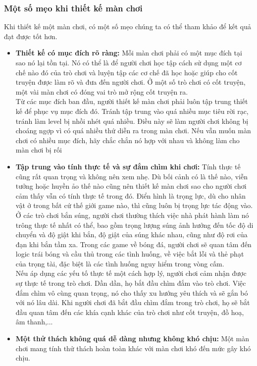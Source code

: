 \subsubsection{Một số mẹo khi thiết kế màn chơi}
\hspace*{0.5cm}  Khi thiết kế một màn chơi, có một số mẹo chúng ta có thể tham khảo để kết quả đạt được tốt hơn.
\begin{itemize}
	\item \textbf{Thiết kế có mục đích rõ ràng: } Mỗi màn chơi phải có một mục đích tại sao nó lại tồn tại. Nó có thể là để người chơi học tập cách sử dụng một cơ chế nào đó của trò chơi và luyện tập các cơ chế đã học hoặc giúp cho cốt truyện được làm rõ và đưa đến người chơi. Ở một số trò chơi có cốt truyện, một vài màn chơi có đóng vai trò mở rộng cốt truyện ra.\\
	Từ các mục đích ban đầu, người thiết kế màn chơi phải luôn tập trung thiết kế để phục vụ mục đích đó. Tránh tập trung vào quá nhiều mục tiêu rời rạc, tránh làm level bị nhồi nhét quá nhiều. Điều này sẽ làm người chơi không bị choáng ngợp vì có quá nhiều thứ diễn ra trong màn chơi. Nếu vẫn muốn màn chơi có nhiều mục đích, hãy chắc chắn nó hợp với nhau và không làm cho màn chơi bị rối
	\item \textbf{Tập trung vào tính thực tế và sự đắm chìm khi chơi: } Tính thực tế cũng rất quan trọng và không nên xem nhẹ. Dù bối cảnh có là thế nào, viễn tưởng hoặc huyền ảo thế nào cũng nên thiết kế màn chơi sao cho người chơi cảm thấy vẫn có tính thực tế trong đó. Điển hình là trọng lực, dù cho nhân vật ở trong bất cứ thế giới game nào, thì cũng luôn bị trọng lực tác động vào. Ở các trò chơi bắn súng, người chơi thường thích việc nhà phát hành làm nó trông thực tế nhất có thể, bao gồm trọng lượng súng ảnh hưởng đến tốc độ di chuyển và độ giật khi bắn, độ giật của súng khác nhau, cũng như độ rơi của đạn khi bắn tầm xa. Trong các game về bóng đá, người chơi sẽ quan tâm đến logic trái bóng và cầu thủ trong các tình huống, về việc bắt lỗi và thẻ phạt của trọng tài, đặc biệt là các tình huống nguy hiểm trong vòng cấm.\\
	Nếu áp dụng các yếu tố thực tế một cách hợp lý, người chơi cảm nhận được sự thực tế trong trò chơi. Dần dần, họ bắt đầu chìm đắm vào trò chơi. Việc đắm chìm vô cùng quan trọng, nó cho thấy xu hướng yêu thích và sẽ gắn bó với nó lâu dài. Khi người chơi đã bắt đầu chìm đắm trong trò chơi, họ sẽ bắt đầu quan tâm đến các khía cạnh khác của trò chơi như cốt truyện, đồ hoạ, âm thanh,...
	\item \textbf{Một thử thách không quá dễ dàng nhưng không khó chịu: } Một màn chơi mang tính thử thách hoàn toàn khác với màn chơi khó đến mức gây khó chịu.\\

\end{itemize}
